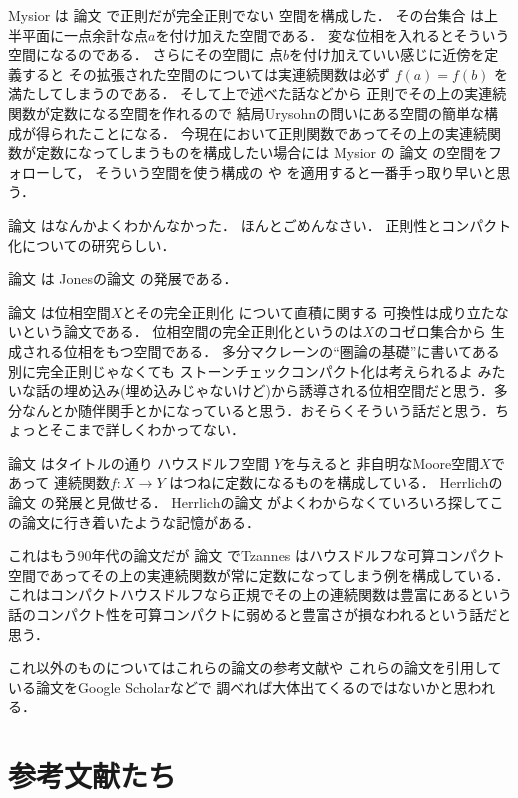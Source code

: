 \documentclass[leqno, a4paper, 12pt]{jsarticle}
\begin{document}
Mysior は
論文
\cite{MR0601748}
で正則だが完全正則でない
空間を構成した．
その台集合
は上半平面に一点余計な点$a$を付け加えた空間である．
変な位相を入れるとそういう空間になるのである．
さらにその空間に
点$b$を付け加えていい感じに近傍を定義すると
その拡張された空間のについては実連続関数は必ず
$f(a)=f(b)$
を満たしてしまうのである．
そして上で述べた話などから
正則でその上の実連続関数が定数になる空間を作れるので
結局Urysohnの問いにある空間の簡単な構成が得られたことになる．
今現在において正則関数であってその上の実連続関数が定数になってしまうものを構成したい場合には
Mysior の
論文
\cite{MR0601748}
の空間をフォローして，
そういう空間を使う構成の
\cite{MR0271902}
や
\cite{MR0312462}
を適用すると一番手っ取り早いと思う．



論文
\cite{MR0614896}
はなんかよくわかんなかった．
ほんとごめんなさい．
正則性とコンパクト化についての研究らしい．

論文
\cite{MR0712857}
は
Jonesの論文
\cite{MR0413044}
の発展である．

論文
\cite{MR0749120}
は位相空間$X$とその完全正則化
について直積に関する
可換性は成り立たないという論文である．
位相空間の完全正則化というのは$X$のコゼロ集合から
生成される位相をもつ空間である．
多分マクレーンの``圏論の基礎''に書いてある別に完全正則じゃなくても
ストーンチェックコンパクト化は考えられるよ
みたいな話の埋め込み(埋め込みじゃないけど)から誘導される位相空間だと思う．多分なんとか随伴関手とかになっていると思う．おそらくそういう話だと思う．ちょっとそこまで詳しくわかってない．

論文
\cite{MR0732053}
はタイトルの通り
ハウスドルフ空間
$Y$を与えると
非自明なMoore空間$X$であって
連続関数$f\colon X\to Y$
はつねに定数になるものを構成している．
Herrlichの論文
\cite{MR0185565}
の発展と見做せる．
Herrlichの論文
\cite{MR0185565}
がよくわからなくていろいろ探してこの論文に行き着いたような記憶がある．

これはもう90年代の論文だが
論文\cite{MR1489200}
でTzannes
はハウスドルフな可算コンパクト
空間であってその上の実連続関数が常に定数になってしまう例を構成している．
これはコンパクトハウスドルフなら正規でその上の連続関数は豊富にあるという話のコンパクト性を可算コンパクトに弱めると豊富さが損なわれるという話だと思う．

これ以外のものについてはこれらの論文の参考文献や
これらの論文を引用している論文をGoogle Scholarなどで
調べれば大体出てくるのではないかと思われる．


\section*{参考文献たち}
\end{document}
